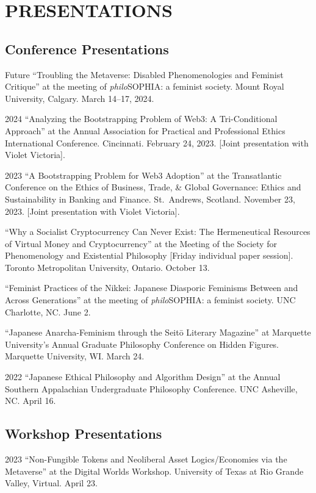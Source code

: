 \documentclass{article}
\begin{document}
\section*{\normalsize{PRESENTATIONS}}
\subsection*{\normalsize{Conference Presentations}}
\begin{tablist}
    \item[Future] \tab{}\enquote{Troubling the Metaverse: Disabled Phenomenologies and Feminist Critique} at the  meeting of \textit{philo}SOPHIA: a feminist society. Mount Royal University, Calgary. March 14--17, 2024.
    \item[2024] \tab{}\enquote{Analyzing the Bootstrapping Problem of Web3: A Tri-Conditional Approach} at the  Annual Association for Practical and Professional Ethics International Conference. Cincinnati. February 24, 2023. [Joint presentation with Violet Victoria].
    \item[2023] \tab{}\enquote{A Bootstrapping Problem for Web3 Adoption} at the  Transatlantic Conference on the Ethics of Business, Trade, \& Global Governance: Ethics and Sustainability in Banking and Finance. St.~Andrews, Scotland. November 23, 2023. [Joint presentation with Violet Victoria].
    \item[] \tab{}\enquote{Why a Socialist Cryptocurrency Can Never Exist: The Hermeneutical Resources of Virtual Money and Cryptocurrency} at the  Meeting of the Society for Phenomenology and Existential Philosophy [Friday individual paper session]. Toronto Metropolitan University, Ontario. October 13.
    \item[] \tab{}\enquote{Feminist Practices of the Nikkei: Japanese Diasporic Feminisms Between and Across Generations} at the  meeting of \textit{philo}SOPHIA: a feminist society. UNC Charlotte, NC. June 2.
    \item[] \tab{}\enquote{Japanese Anarcha-Feminism through the Seitō Literary Magazine} at Marquette University's Annual Graduate Philosophy Conference on Hidden Figures. Marquette University, WI. March 24.
    \item[2022] \tab{}\enquote{Japanese Ethical Philosophy and Algorithm Design} at the  Annual Southern Appalachian Undergraduate Philosophy Conference. UNC Asheville, NC. April 16.
\end{tablist}
\subsection*{\normalsize{Workshop Presentations}}
\begin{tablist}
    \item[2023] \tab{}\enquote{Non-Fungible Tokens and Neoliberal Asset Logics/Economies via the Metaverse} at the Digital Worlds Workshop. University of Texas at Rio Grande Valley, Virtual. April 23.
\end{tablist}
\end{document}
